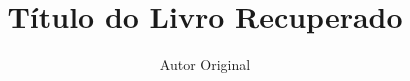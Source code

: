 \documentclass[11pt,b5paper,twoside,openright]{book}
\title{\textbf{Título do Livro Recuperado}}
\author{Autor Original}
\date{}
\begin{document}
\begingroup
\let\cleardoublepage\clearpage
\inserircapa

\folhaderosto

\manifestoeditorial

\frontmatter
\tableofcontents
\clearpage
\endgroup

\mainmatter
% 
% 
\end{document}
